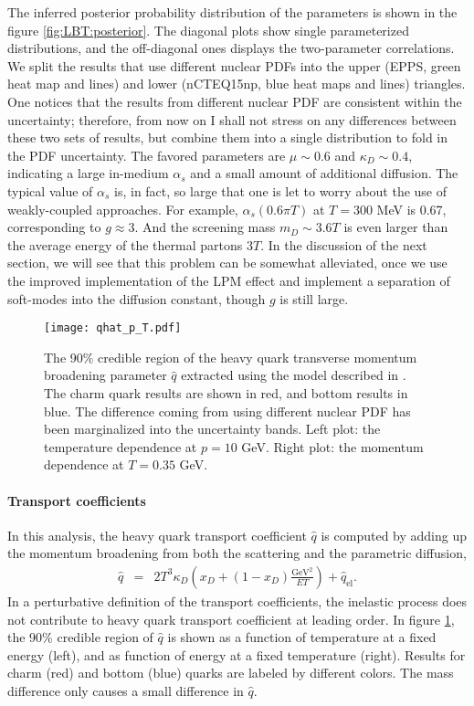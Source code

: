 The inferred posterior probability distribution of the parameters is shown in the figure \ref{fig:LBT:posterior}.
The diagonal plots show single parameterized distributions, and the off-diagonal ones displays the two-parameter correlations.
We split the results that use different nuclear PDFs into the upper (EPPS, green heat map and lines) and lower (nCTEQ15np, blue heat maps and lines) triangles.
One notices that the results from different nuclear PDF are consistent within the uncertainty; therefore, from now on I shall not stress on any differences between these two sets of results, but combine them into a single distribution to fold in the PDF uncertainty.
The favored parameters are $\mu \sim 0.6$ and $\kappa_D \sim 0.4$, indicating a large in-medium $\alpha_s$ and a small amount of additional diffusion.
The typical value of $\alpha_s$ is, in fact, so large that one is let to worry about the use of weakly-coupled approaches.
For example, $\alpha_s(0.6\pi T)$ at $T=300$ MeV is 0.67, corresponding to $g \approx 3$. 
And the screening mass $m_D \sim 3.6 T$ is even larger than the average energy of the thermal partons $3T$. 
In the discussion of the next section, we will see that this problem can be somewhat alleviated, once we use the improved implementation of the LPM effect and implement a separation of soft-modes into the diffusion constant, though $g$ is still large.

\begin{figure}
\texttt{[image: qhat\_p\_T.pdf]}
\caption{The 90\% credible region of the heavy quark transverse momentum broadening parameter $\hat{q}$ extracted using the model described in \cite{Ke:2018tsh}.
The charm quark results are shown in red, and bottom results in blue.
The difference coming from using different nuclear PDF has been marginalized into the uncertainty bands.
Left plot: the temperature dependence at $p=10$ GeV. Right plot: the momentum dependence at $T=0.35$ GeV.
}\label{fig:LBT:posterior_qhat}
\end{figure}

\paragraph{Transport coefficients} In this analysis, the heavy quark transport coefficient $\hat{q}$ is computed by adding up the momentum broadening from both the scattering and the parametric diffusion,
\begin{eqnarray}\label{eq:qhat}
\hat{q} &=& 2T^3\kappa_D\left(x_D + (1-x_D)\frac{\textrm{GeV}^2}{ET}\right) + \hat{q}_{\textrm{el}}.
\end{eqnarray}
In a perturbative definition of the transport coefficients, the inelastic process does not contribute to heavy quark transport coefficient at leading order. 
In figure \ref{fig:LBT:posterior_qhat}, the 90\% credible region of $\hat{q}$ is shown as a function of temperature at a fixed energy (left), and as function of energy at a fixed temperature (right).
Results for charm (red) and bottom (blue) quarks are labeled by different colors.
The mass difference only causes a small difference in $\hat{q}$.

